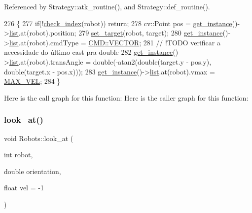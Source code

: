 Referenced by Strategy\+::atk\+\_\+routine(), and Strategy\+::def\+\_\+routine().


\begin{DoxyCode}
276                                            \{
277     \textcolor{keywordflow}{if}(!\hyperlink{robots_8hpp_ae3e6ae8f87cdc750c0b99bc609d9ae43}{check\_index}(robot)) \textcolor{keywordflow}{return};
278     cv::Point pos = \hyperlink{class_robots_a589bce74db5f34af384952d48435168f}{get\_instance}()->\hyperlink{class_robots_a2c6b77265028f82a4342ca1ef15ed305}{list}.at(robot).position;
279     \hyperlink{class_robots_ac1cd5c41b6e5d5643b2186ca51699c8f}{set\_target}(robot, target);
280     \hyperlink{class_robots_a589bce74db5f34af384952d48435168f}{get\_instance}()->\hyperlink{class_robots_a2c6b77265028f82a4342ca1ef15ed305}{list}.at(robot).cmdType = \hyperlink{serial_w_8hpp_ac6e89954deaa373db52a91ac6db50884}{CMD::VECTOR};
281     \textcolor{comment}{// !TODO verificar a necessidade do último cast pra double}
282     \hyperlink{class_robots_a589bce74db5f34af384952d48435168f}{get\_instance}()->\hyperlink{class_robots_a2c6b77265028f82a4342ca1ef15ed305}{list}.at(robot).transAngle = double(-atan2(\textcolor{keywordtype}{double}(target.y - pos.y), \textcolor{keywordtype}{
      double}(target.x - pos.x)));
283     \hyperlink{class_robots_a589bce74db5f34af384952d48435168f}{get\_instance}()->\hyperlink{class_robots_a2c6b77265028f82a4342ca1ef15ed305}{list}.at(robot).vmax = \hyperlink{class_robots_aef695d1329ee9902311720afdfa095a1}{MAX\_VEL};
284 \}
\end{DoxyCode}
Here is the call graph for this function\+:
Here is the caller graph for this function\+:
\mbox{\label{class_robots_a3b307142c41d7adc7614e6e4f2caf16b}} 
\subsubsection{\texorpdfstring{look\+\_\+at()}{look\_at()}\hspace{0.1cm}{\footnotesize\ttfamily [1/2]}}
{\footnotesize\ttfamily void Robots\+::look\+\_\+at (\begin{DoxyParamCaption}\item[{int}]{robot,  }\item[{double}]{orientation,  }\item[{float}]{vel = {\ttfamily -\/1} }\end{DoxyParamCaption})\hspace{0.3cm}{\ttfamily [static]}}

